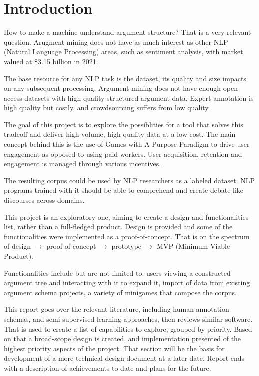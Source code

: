 \documentclass{report}
\begin{document}
\newpage

\tableofcontents

\newpage

\chapter{Introduction}
How to make a machine understand argument structure?
That is a very relevant question. Arugment mining does not have as much interest as other NLP (Natural Language Processing) areas, such as sentiment analysis, with market valued at \$3.15 billion in 2021. \cite{noauthor_sentiment_nodate}

The base resource for any NLP task is the dataset, its quality and size impacts on any subsequent processing. Argument mining does not have enough open access datasets with high quality structured argument data.  Expert annotation is high quality but costly, and crowdsourcing suffers from low quality. 

The goal of this project is to explore the possiblities for a tool that solves this tradeoff and deliver high-volume, high-quality data at a low cost. 
The main concept behind this is the use of Games with A Purpose Paradigm to drive user engagement as opposed to using paid workers. User acquisition, retention and engagement is managed through various incentives. 

The resulting corpus could be used by NLP researchers as a labeled dataset. NLP programs trained with it should be able to comprehend and create debate-like discourses across domains.

This project is an exploratory one, aiming to create a design and functionalities list, rather than a full-fledged product.
Design is provided and some of the functionalities were implemented as a proof-of-concept. 
That is on the spectrum of design $\rightarrow$ proof of concept $\rightarrow$ prototype $\rightarrow$ MVP (Minimum Viable Product).

Functionalities include but are not limited to: users viewing a constructed argument tree and interacting with it to expand it, import of data from existing argument schema projects, a variety of minigames that compose the corpus. 

This report goes over the relevant literature, including human annotation schemas, and semi-supervised learning approaches, then reviews similar software. That is used to create a list of capabilities to explore, grouped by priority. Based on that a broad-scope design is created, and implementation presented of the highest priority aspects of the project.
That section will be the basis for development of a more technical design document at a later date.
Report ends with a description of achievements to date and plans for the future.
\end{document}

